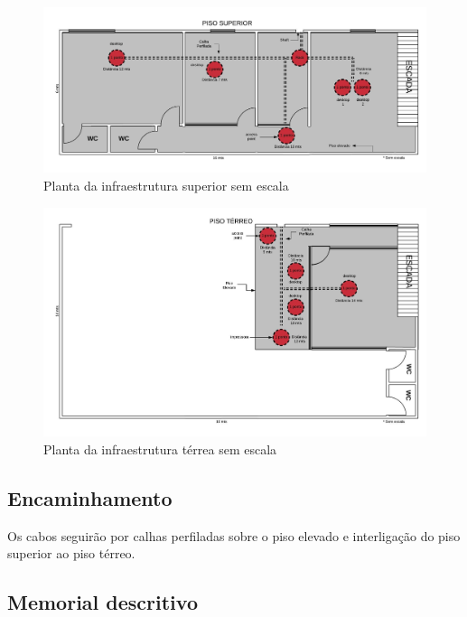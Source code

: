 \documentclass[	DIV=calc,%
							paper=a4,%
							fontsize=12pt,%
							onecolumn]{scrartcl}	 					%
\begin{document}
\begin{figure}[H]
	\centering
	\includegraphics[width=\textwidth]{InfraestruturaSuperior}
	\caption{Planta da infraestrutura superior sem escala}
	\label{fig4}
\end{figure}

\begin{figure}[H]
	\centering
	\includegraphics[width=\textwidth]{InfraestruturaTerreo}
	\caption{Planta da infraestrutura térrea sem escala}
	\label{fig3}
\end{figure}


\subsection{Encaminhamento}
Os cabos seguirão por calhas perfiladas sobre o piso elevado e interligação do piso superior ao piso térreo. 

\subsection{Memorial descritivo}
\end{document}
